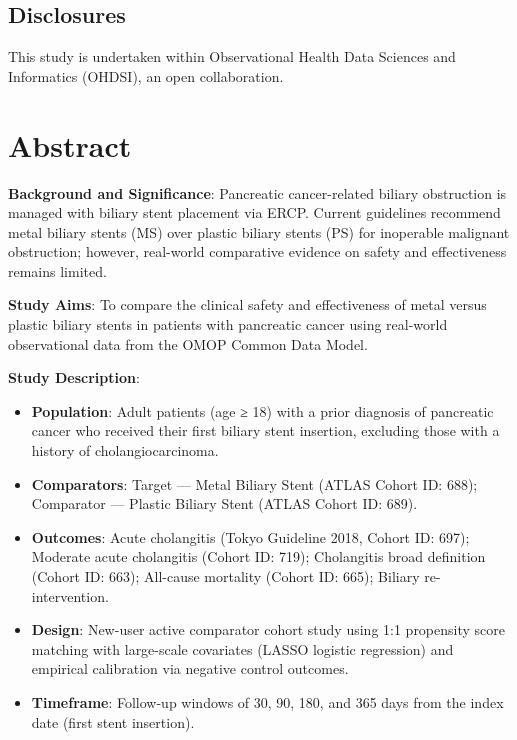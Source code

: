\documentclass[
  12pt,
]{article}
\begin{document}
\subsection{Disclosures}\label{disclosures}

This study is undertaken within Observational Health Data Sciences and Informatics (OHDSI), an open collaboration.

\clearpage

\section{Abstract}\label{abstract}

\textbf{Background and Significance}: Pancreatic cancer-related biliary obstruction is managed with biliary stent placement via ERCP. Current guidelines recommend metal biliary stents (MS) over plastic biliary stents (PS) for inoperable malignant obstruction; however, real-world comparative evidence on safety and effectiveness remains limited.

\textbf{Study Aims}: To compare the clinical safety and effectiveness of metal versus plastic biliary stents in patients with pancreatic cancer using real-world observational data from the OMOP Common Data Model.

\textbf{Study Description}:

\begin{itemize}
\item
  \textbf{Population}: Adult patients (age ≥ 18) with a prior diagnosis of pancreatic cancer who received their first biliary stent insertion, excluding those with a history of cholangiocarcinoma.
\item
  \textbf{Comparators}: Target --- Metal Biliary Stent (ATLAS Cohort ID: 688); Comparator --- Plastic Biliary Stent (ATLAS Cohort ID: 689).
\item
  \textbf{Outcomes}: Acute cholangitis (Tokyo Guideline 2018, Cohort ID: 697); Moderate acute cholangitis (Cohort ID: 719); Cholangitis broad definition (Cohort ID: 663); All-cause mortality (Cohort ID: 665); Biliary re-intervention.
\item
  \textbf{Design}: New-user active comparator cohort study using 1:1 propensity score matching with large-scale covariates (LASSO logistic regression) and empirical calibration via negative control outcomes.
\item
  \textbf{Timeframe}: Follow-up windows of 30, 90, 180, and 365 days from the index date (first stent insertion).
\end{itemize}
\end{document}
